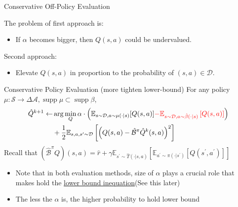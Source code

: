 \documentclass[11pt]{beamer}
\newcommand{\mbb}[1]{\mathbb{#1}}
\newcommand{\mc}[1]{\mathcal{#1}}
\newcommand{\supp}{\operatorname{supp}}
\begin{document}
\begin{frame}{Conservative Off-Policy Evaluation}

  The problem of first approach is:
  \begin{itemize}
    \item If $\alpha$ becomes bigger, then $Q(s,a)$ could be undervalued.
  \end{itemize}

  Second approach:
  \begin{itemize}
    \item Elevate $Q(s,a)$ in proportion to the probability of $(s,a)\in \mc{D}$.
  \end{itemize}

  \begin{block}{Conservative Policy Evaluation (more tighten lower-bound)}
    For any policy $\mu : \mc{S} \to \Delta{\mc{A}}, \supp \mu \subset \supp \beta$,
    \begin{equation} \label{eq:2}
    \begin{aligned}
          \hat{Q}^{k+1} \leftarrow &\arg \min_{Q} \alpha \cdot \left(\mbb{E}_{s \sim \mc{D}, a \sim \mu(\cdot|s)}[Q(s,a)] \textcolor{red}{- \mbb{E}_{s \sim \mc{D}, a \sim \hat{\beta}(\cdot|s)} \left[Q(s,a)\right]} \right) \\
          &+ \frac{1}{2} \mbb{E}_{s,a,s^\prime \sim \mc{D}} \left[ \left(Q(s,a) - \hat{\mc{B}}^\pi \hat{Q}^{k}(s,a)\right)^2\right]
    \end{aligned}
    \end{equation}
  Recall that $ (\hat{\mc{B}}^\pi Q)(s,a) = \hat{r} + \gamma \mbb{E}_{s^\prime \sim \hat{T}(\cdot | s,a)}\left[\mbb{E}_{a^\prime \sim \pi(\cdot |s^\prime)} \left[ Q(s^\prime,a^\prime) \right]\right]$
  \end{block}


  \begin{itemize}
    \item Note that in both evaluation methods, size of $\alpha$ plays a crucial role that makes hold the \underline{lower bound inequation}(See this later)
    \item The less the $\alpha$ is, the higher probability to hold lower bound
  \end{itemize}
\end{frame}
\end{document}

